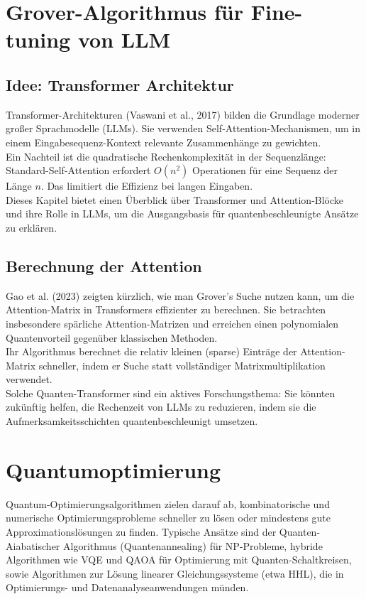 \section{Grover-Algorithmus für Fine-tuning von LLM}
\subsection{Idee: Transformer Architektur}
Transformer-Architekturen (Vaswani et al., 2017) bilden die Grundlage moderner großer Sprachmodelle (LLMs). Sie verwenden Self-Attention-Mechanismen, um in einem Eingabesequenz-Kontext relevante Zusammenhänge zu gewichten.\\
Ein Nachteil ist die quadratische Rechenkomplexität in der Sequenzlänge: Standard-Self-Attention erfordert $O(n^2)$ Operationen für eine Sequenz der Länge $n$. Das limitiert die Effizienz bei langen Eingaben.\\
Dieses Kapitel bietet einen Überblick über Transformer und Attention-Blöcke und ihre Rolle in LLMs, um die Ausgangsbasis für quantenbeschleunigte Ansätze zu erklären.

\subsection{Berechnung der Attention}
Gao et al. (2023) zeigten kürzlich, wie man Grover’s Suche nutzen kann, um die Attention-Matrix in Transformers effizienter zu berechnen. Sie betrachten insbesondere spärliche Attention-Matrizen und erreichen einen polynomialen Quantenvorteil gegenüber klassischen Methoden.\\
Ihr Algorithmus berechnet die relativ kleinen (sparse) Einträge der Attention-Matrix schneller, indem er Suche statt vollständiger Matrixmultiplikation verwendet.\\
Solche Quanten-Transformer sind ein aktives Forschungsthema: Sie könnten zukünftig helfen, die Rechenzeit von LLMs zu reduzieren, indem sie die Aufmerksamkeitsschichten quantenbeschleunigt umsetzen.

\section{Quantumoptimierung}
Quantum-Optimierungsalgorithmen zielen darauf ab, kombinatorische und numerische Optimierungsprobleme schneller zu lösen oder mindestens gute Approximationslösungen zu finden. Typische Ansätze sind der Quanten-Aiabatischer Algorithmus (Quantenannealing) für NP-Probleme, hybride Algorithmen wie VQE und QAOA für Optimierung mit Quanten-Schaltkreisen, sowie Algorithmen zur Lösung linearer Gleichungssysteme (etwa HHL), die in Optimierungs- und Datenanalyseanwendungen münden.

